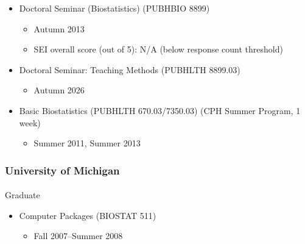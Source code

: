\documentclass[
  english,
  letterpaper,
  DIV=11,
  numbers=noendperiod]{scrartcl}
\makeatletter
\let\oldparagraph\paragraph
\renewcommand{\paragraph}{
    \@ifstar
      \xxxParagraphStar
      \xxxParagraphNoStar
  }
\newcommand{\xxxParagraphStar}[1]{\oldparagraph*{#1}\mbox{}}
\newcommand{\xxxParagraphNoStar}[1]{\oldparagraph{#1}\mbox{}}
\providecommand{\tightlist}{%
  \setlength{\itemsep}{0pt}\setlength{\parskip}{0pt}}
\makeatother
\begin{document}
\begin{itemize}
  \begin{itemize}
  \tightlist
  \item
    Autumn 2019, Autumn 2023, Autumn 2025
  \item
    SEI overall score (out of 5): 5.0, 5.0
  \item
    Survey of the Student Learning Experience (SSLE) mean score range
    (out of 5): 4.9-4.9 (AU25)
  \end{itemize}
\item
  Doctoral Seminar (Biostatistics) (PUBHBIO 8899)

  \begin{itemize}
  \tightlist
  \item
    Autumn 2013
  \item
    SEI overall score (out of 5): N/A (below response count threshold)
  \end{itemize}
\item
  Doctoral Seminar: Teaching Methods (PUBHLTH 8899.03)

  \begin{itemize}
  \tightlist
  \item
    Autumn 2026
  \end{itemize}
\item
  Basic Biostatistics (PUBHLTH 670.03/7350.03) (CPH Summer Program, 1
  week)

  \begin{itemize}
  \tightlist
  \item
    Summer 2011, Summer 2013
  \end{itemize}
\end{itemize}

\subsubsection{University of Michigan}\label{university-of-michigan}

\paragraph{Graduate}\label{graduate-1}

\begin{itemize}
\tightlist
\item
  Computer Packages (BIOSTAT 511)

  \begin{itemize}
  \tightlist
  \item
    Fall 2007--Summer 2008
  \end{itemize}
\end{itemize}
\end{document}
